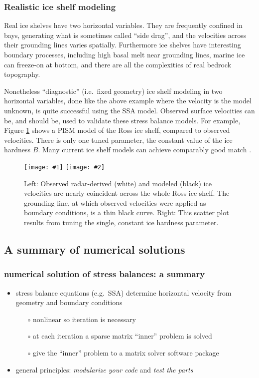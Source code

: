 \documentclass[titlepage,letterpaper,final,12pt]{scrartcl}
\newcommand{\twofigsizes}[5]{
\begin{figure}[ht]
\centering
\texttt{[image: \#1]} \quad
\texttt{[image: \#2]}
\caption{#3}
\label{fig:#1}
\end{figure}}
\begin{document}
\subsubsection*{Realistic ice shelf modeling}  Real ice shelves have two horizontal variables.  They are frequently confined in bays, generating what is sometimes called ``side drag'', and the velocities across their grounding lines varies spatially.  Furthermore ice shelves have interesting boundary processes, including high basal melt near grounding lines, marine ice can freeze-on at bottom, and there are all the complexities of real bedrock topography.

Nonetheless ``diagnostic'' (i.e.~fixed geometry) ice shelf modeling in two horizontal variables, done like the above example where the velocity is the model unknown, is quite successful using the SSA model.  Observed surface velocities can be, and should be, used to validate these stress balance models.  For example, Figure \ref{fig:rossquiver} shows a PISM model of the Ross ice shelf, compared to observed velocities.  There is only one tuned parameter, the constant value of the ice hardness $B$.  Many current ice shelf models can achieve comparably good match \cite{MacAyealetal}.

\twofigsizes{rossquiver}{rossscatter}{Left: Observed radar-derived (white) and modeled (black) ice velocities are nearly coincident across the whole Ross ice shelf.  The grounding line, at which observed velocities were applied as boundary conditions, is a thin black curve.  Right: This scatter plot results from tuning the single, constant ice hardness parameter.}{2.7in}{3.0in}


\subsection{A summary of numerical solutions}

\subsubsection*{numerical solution of stress balances: a summary}

\begin{itemize}
\item stress balance equations (e.g.~SSA) determine horizontal velocity from geometry and boundary conditions
  \begin{itemize}
  \item[$\circ$] nonlinear so iteration is necessary
  \item[$\circ$] at each iteration a sparse matrix ``inner'' problem is solved
  \item[$\circ$] give the ``inner'' problem to a matrix solver software package
  \end{itemize}
\item general principles: \emph{modularize your code} and \emph{test the parts}
\end{itemize}
\end{document}
